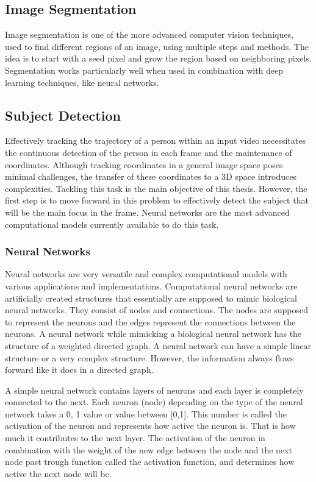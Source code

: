 \documentclass[12pt]{report}
\begin{document}
\subsection{Image Segmentation}

Image segmentation is one of the more advanced computer vision techniques, used to find different regions of an image, using multiple steps and methods. The idea is to start with a seed pixel and grow the region based on neighboring pixels. Segmentation works particularly well when used in combination with deep learning techniques, like neural networks.

\subsection{Subject Detection }

Effectively tracking the trajectory of a person within an input video necessitates the continuous detection of the person in each frame and the maintenance of coordinates. Although tracking coordinates in a general image space poses minimal challenges, the transfer of these coordinates to a 3D space introduces complexities. Tackling this task is the main objective of this thesis. However, the first step is to move forward in this problem to effectively detect the subject that will be the main focus in the frame. Neural networks are the most advanced computational models currently available to do this task.

\subsubsection{Neural Networks}

Neural networks are very versatile and complex computational models with various applications and implementations. Computational neural networks are artificially created structures that essentially are supposed to mimic biological neural networks. They consist of nodes and connections. The nodes are supposed to represent the neurons and the edges represent the connections between the neurons. A neural network while mimicking a biological neural network has the structure of a weighted directed graph. A neural network can have a simple linear structure or a very complex structure. However, the information always flows forward like it does in a directed graph.\newline

A simple neural network contains layers of neurons and each layer is completely connected to the next. Each neuron (node) depending on the type of the neural network takes a {0}, {1} value or value between [0,1]. This number is called the activation of the neuron and represents how active the neuron is. That is how much it contributes to the next layer. The activation of the neuron in combination with the weight of the new edge between the node and the next node past trough function called the activation function, and determines how active the next node will be.\newline
\end{document}
